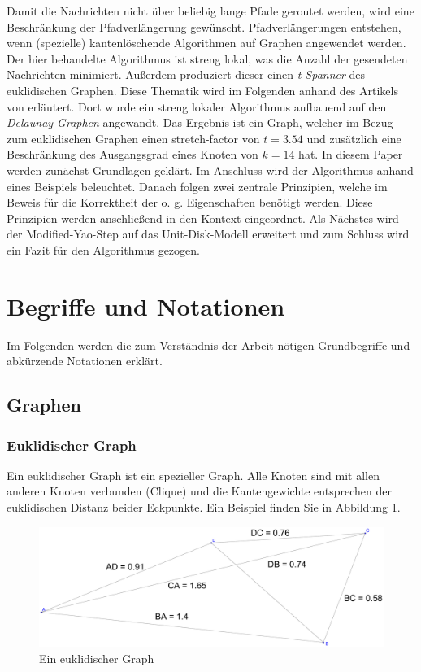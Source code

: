\documentclass[a4paper,twoside]{IEEEtran}
\begin{document}
Damit die Nachrichten nicht über beliebig lange Pfade geroutet werden, wird eine Beschränkung der Pfadverlängerung gewünscht. 
Pfadverlängerungen entstehen, wenn (spezielle) kantenlöschende Algorithmen auf Graphen angewendet werden.
Der hier behandelte Algorithmus ist streng lokal, was die Anzahl der gesendeten Nachrichten minimiert.
Außerdem produziert dieser einen \emph{t-Spanner} des euklidischen Graphen.
Diese Thematik wird im Folgenden anhand des Artikels von \cite{kanj} erläutert.
Dort wurde ein streng lokaler Algorithmus aufbauend auf den \emph{Delaunay-Graphen} angewandt.
Das Ergebnis ist ein Graph, welcher im Bezug zum euklidischen Graphen einen stretch-factor von $t=3.54 $ und zusätzlich eine Beschränkung des Ausgangsgrad eines Knoten von $k=14 $ hat.
In diesem Paper werden zunächst Grundlagen geklärt.
Im Anschluss wird der Algorithmus anhand eines Beispiels beleuchtet.
Danach folgen zwei zentrale Prinzipien, welche im Beweis für die Korrektheit der o. g. Eigenschaften benötigt werden.
Diese Prinzipien werden anschließend in den Kontext eingeordnet.
Als Nächstes wird der Modified-Yao-Step auf das Unit-Disk-Modell erweitert und zum Schluss wird ein Fazit für den Algorithmus gezogen.




\section{Begriffe und Notationen}
Im Folgenden werden die zum Verständnis der Arbeit nötigen Grundbegriffe und abkürzende Notationen erklärt.




\subsection{Graphen}
\subsubsection{Euklidischer Graph}
Ein euklidischer Graph ist ein spezieller Graph. 
Alle Knoten sind mit allen anderen Knoten verbunden (Clique) und die Kantengewichte entsprechen der euklidischen Distanz beider Eckpunkte. 
Ein Beispiel finden Sie in Abbildung \ref{fig:Graph}.
\begin{figure}[h!]
\centering
\includegraphics[width=0.99\linewidth]{Graph.eps}
\caption{Ein euklidischer Graph}
\label{fig:Graph}
\end{figure}
\end{document}
